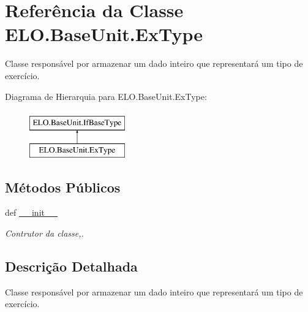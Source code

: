 \hypertarget{classELO_1_1BaseUnit_1_1ExType}{\section{Referência da Classe E\-L\-O.\-Base\-Unit.\-Ex\-Type}
\label{de/d96/classELO_1_1BaseUnit_1_1ExType}
}


Classe responsável por armazenar um dado inteiro que representará um tipo de exercício.  


Diagrama de Hierarquia para E\-L\-O.\-Base\-Unit.\-Ex\-Type\-:\begin{figure}[H]
\begin{center}
\leavevmode
\includegraphics[height=2.000000cm]{de/d96/classELO_1_1BaseUnit_1_1ExType}
\end{center}
\end{figure}
\subsection*{Métodos Públicos}
\begin{DoxyCompactItemize}
\item 
def \hyperlink{classELO_1_1BaseUnit_1_1ExType_aca9932deaf8fe247d16ce17909d3dfbf}{\-\_\-\-\_\-init\-\_\-\-\_\-}
\begin{DoxyCompactList}\small\item\em Contrutor da classe,. \end{DoxyCompactList}\end{DoxyCompactItemize}


\subsection{Descrição Detalhada}
Classe responsável por armazenar um dado inteiro que representará um tipo de exercício. 



